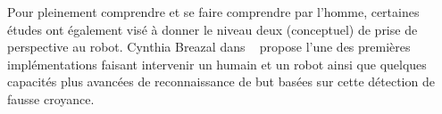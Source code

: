 \documentclass[a4paper,11pt,twoside]{StyleThese}
\begin{document}
Pour pleinement comprendre et se faire comprendre par l'homme, certaines études ont également visé à donner le niveau deux (conceptuel) de prise de perspective au robot. Cynthia Breazal dans ~\cite{BreazealGB09} propose l'une des premières implémentations faisant intervenir un humain et un robot ainsi que quelques capacités plus avancées de reconnaissance de but basées sur cette détection de fausse croyance.





\end{document}
